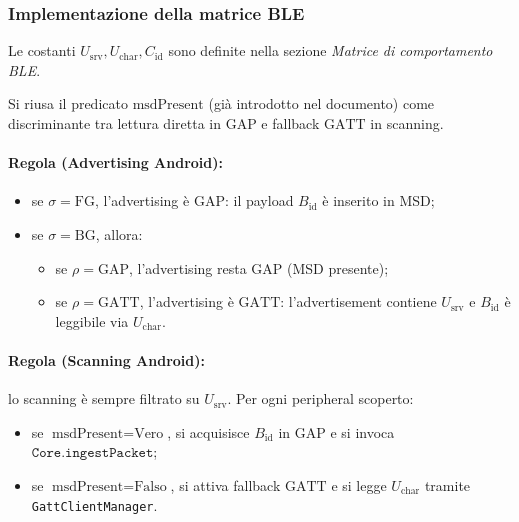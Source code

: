 \documentclass[a4paper,11pt,table,dvipsnames]{article}
\begin{document}
\subsubsection{Implementazione della matrice BLE}
Le costanti \(U_{\text{srv}}, U_{\text{char}}, C_{\text{id}}\) sono definite nella sezione \emph{Matrice di comportamento BLE}.

Si riusa il predicato \(\text{msdPresent}\) (già introdotto nel documento) come discriminante tra lettura diretta in \(\text{GAP}\) e fallback \(\text{GATT}\) in scanning.

\paragraph{Regola (Advertising Android):}
\begin{itemize}[nosep]
    \item se \(\sigma=\mathrm{FG}\), l’advertising è \(\text{GAP}\): il payload \(B_{\text{id}}\) è inserito in MSD;
    \item se \(\sigma=\mathrm{BG}\), allora:
          \begin{itemize}[nosep]
              \item se \(\rho=\mathrm{GAP}\), l’advertising resta \(\text{GAP}\) (MSD presente);
              \item se \(\rho=\mathrm{GATT}\), l’advertising è \(\text{GATT}\): l’advertisement contiene \(U_{\text{srv}}\) e \(B_{\text{id}}\) è leggibile via \(U_{\text{char}}\).
          \end{itemize}
\end{itemize}

\paragraph{Regola (Scanning Android):}
lo scanning è sempre filtrato su \(U_{\text{srv}}\). Per ogni peripheral scoperto:
\begin{itemize}[nosep]
    \item se \(\text{msdPresent}=\text{Vero}\), si acquisisce \(B_{\text{id}}\) in \(\text{GAP}\) e si invoca \(\texttt{Core.ingestPacket}\);
    \item se \(\text{msdPresent}=\text{Falso}\), si attiva fallback \(\text{GATT}\) e si legge \(U_{\text{char}}\) tramite \texttt{GattClientManager}.
\end{itemize}
\end{document}

